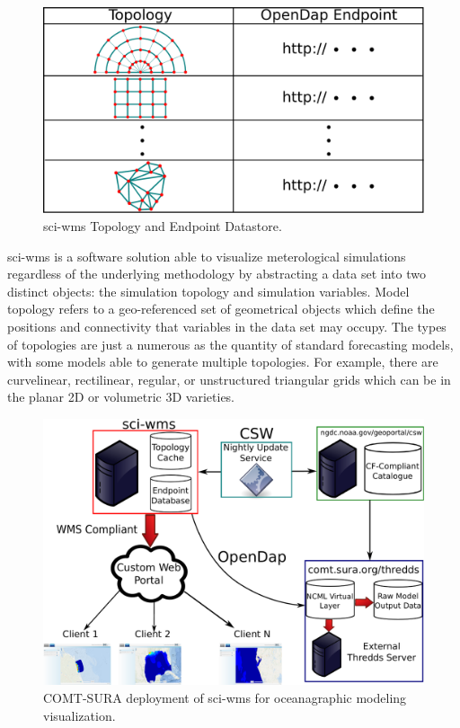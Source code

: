 \documentclass[11pt,twocolumn,twoside]{IEEEtran}
\begin{document}
\begin{figure}
  \centering
  \includegraphics[width=\columnwidth]{./figs/sciwms_db_topology_endpoints.pdf}
  \caption{sci-wms Topology and Endpoint Datastore.}
  \label{fig:sciwms_topology_endpoints}
\end{figure}

sci-wms is a software solution able to visualize meterological
simulations regardless of the underlying methodology by abstracting a
data set into two distinct objects: the simulation topology and
simulation variables. Model topology refers to a geo-referenced set of
geometrical objects which define the positions and connectivity that
variables in the data set may occupy. The types of topologies are just
a numerous as the quantity of standard forecasting models, with some
models able to generate multiple topologies. For example, there are
curvelinear, rectilinear, regular, or unstructured triangular grids
which can be in the planar 2D or volumetric 3D varieties.

\begin{figure}
  \centering
  \includegraphics[width=\columnwidth]{./figs/overview.pdf}
  \caption{COMT-SURA deployment of sci-wms for oceanagraphic modeling visualization.}
  \label{fig:overview1}
\end{figure}





\end{document}
